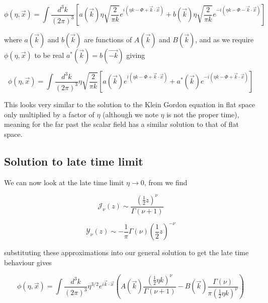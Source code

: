 \documentclass[a4paper,11pt]{article}
\numberwithin{equation}{section}
\numberwithin{figure}{section}
\begin{document}
\begin{large}
\begin{equation}
\label{genKGsol1 eta>>1}    
    \phi(\eta,\Vec{x})=\int \frac{d^3k}{(2\pi)^3}\left[a(\Vec{k})\eta\sqrt{\frac{2}{\pi k}}e^{i(\eta k-\Phi+\Vec{k}\cdot\Vec{x})}+b(\Vec{k})\eta\sqrt{\frac{2}{\pi k}}e^{-i(\eta k-\Phi-\Vec{k}\cdot\Vec{x})} \right]
\end{equation}

where $a(\Vec{k})$ and $b(\Vec{k})$ are functions of $A(\Vec{k})$ and $B(\Vec{k})$, and as we require $\phi(\eta,\Vec{x})$ to be real $a^*(\Vec{k})=b(\Vec{-k})$ giving

\begin{equation}
\label{genKGsol eta>>1}    
    \phi(\eta,\Vec{x})=\int \frac{d^3k}{(2\pi)^3}\eta\sqrt{\frac{2}{\pi k}}\left[a(\Vec{k})e^{i(\eta k-\Phi+\Vec{k}\cdot\Vec{x})}+a^*(\Vec{k})e^{-i(\eta k-\Phi+\Vec{k}\cdot\Vec{x})} \right]
\end{equation}

This looks very similar to the solution to the Klein Gordon equation in flat space only multiplied by a factor of $\eta$ (although we note $\eta$ is not the proper time), meaning for the far past the scalar field has a similar solution to that of flat space.



\subsection{Solution to late time limit}

We can now look at the late time limit $\eta\rightarrow0$, from \cite{limitingform} we find

\begin{equation}
\label{J(z) z<<1}    
    \mathcal{J}_\nu(z)\sim \frac{(\frac{1}{2}z)^\nu}{\Gamma (\nu+1)}
\end{equation}

\begin{equation}
\label{Y(z) z<<1}    
    \mathcal{Y}_\nu(z)\sim -\frac{1}{\pi} \Gamma (\nu)(\frac{1}{2}z)^{-\nu}
\end{equation}

\newpage

substituting these approximations into our general solution to get the late time behaviour gives

\begin{equation}
\label{genKGsol eta<<1}    
    \phi(\eta,\Vec{x})=\int \frac{d^3k}{(2\pi)^3}\eta^{3/2}e^{i\Vec{k}\cdot\Vec{x}}\left(A(\Vec{k}) \frac{(\frac{1}{2}\eta k)^\nu}{\Gamma(\nu+1)}-B(\Vec{k})\frac{\Gamma(\nu)}{\pi(\frac{1}{2}\eta k)^\nu}\right)
\end{equation}


\end{large}
\end{document}
